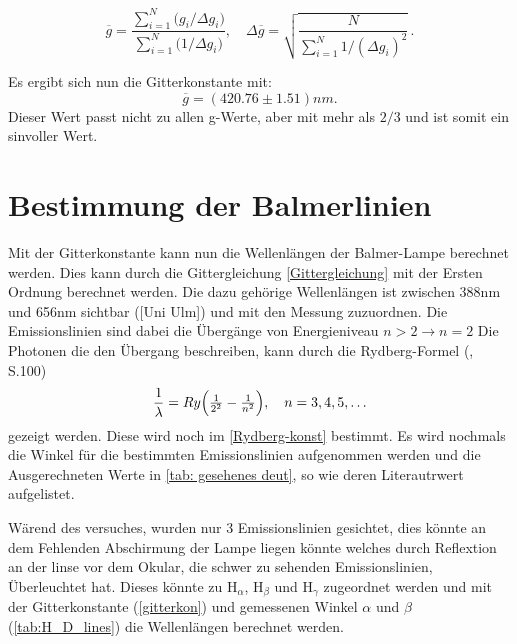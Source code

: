 \begin{equation}
  \overline{g}
  = \frac{\sum_{i=1}^{N} \bigl(g_i/\Delta g_i\bigr)}
         {\sum_{i=1}^{N} \bigl(1/\Delta g_i\bigr)},
  \quad
  \Delta\overline{g}
  = \sqrt{\frac{N}{\sum_{i=1}^{N} 1/(\Delta g_i)^{2}}}\,.
\end{equation}

Es ergibt sich nun die Gitterkonstante mit:
\begin{equation}
    \overline{g} = (420.76 \pm 1.51) nm.
    \label{gitterkon}
\end{equation}
Dieser Wert passt nicht zu allen g-Werte, aber mit mehr als $2/3$ und ist somit ein sinvoller Wert. 

\section{Bestimmung der Balmerlinien} \label{Bestimmung der Balmer}

Mit der Gitterkonstante kann nun die Wellenlängen der Balmer-Lampe berechnet werden. 
Dies kann durch die Gittergleichung \ref{Gittergleichung} mit der Ersten Ordnung berechnet werden.
Die dazu gehörige Wellenlängen ist zwischen 388nm und 656nm sichtbar ([Uni Ulm]) und mit den Messung zuzuordnen.
Die Emissionslinien sind dabei die Übergänge von Energieniveau $n > 2 \xrightarrow{} n = 2$ 
Die Photonen die den Übergang beschreiben, kann durch die Rydberg-Formel (\cite{Demtröder_Ex3}, S.100) 
\begin{equation}
  \frac{1}{\lambda}
  = Ry\Bigl(\tfrac{1}{2^{2}} - \tfrac{1}{n^{2}}\Bigr),
  \quad n=3,4,5,\dots
  \label{Rydberg-Formel}
\end{equation}
gezeigt werden.
Diese wird noch im \cref{Rydberg-konst} bestimmt. 
Es wird nochmals die Winkel für die bestimmten Emissionslinien aufgenommen werden und die Ausgerechneten Werte in \cref{tab: gesehenes deut}, so wie deren Literautrwert aufgelistet. 

Wärend des versuches, wurden nur 3 Emissionslinien gesichtet, dies könnte an dem Fehlenden Abschirmung der Lampe liegen könnte welches durch Reflextion an der linse vor dem Okular, die schwer zu sehenden Emissionslinien, Überleuchtet hat. %
Dieses könnte zu H$_\alpha$, H$_\beta$ und H$_\gamma$ zugeordnet werden und mit der Gitterkonstante (\cref{gitterkon}) und gemessenen Winkel $\alpha$ und $\beta$ (\cref{tab:H_D_lines}) die Wellenlängen berechnet werden.

